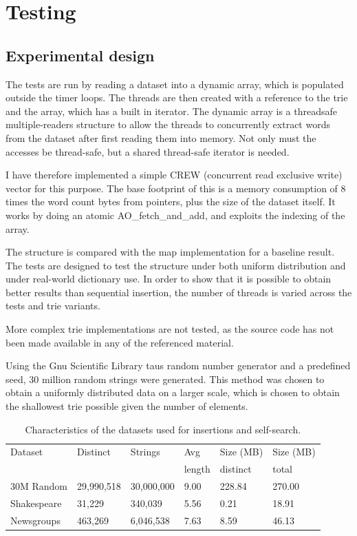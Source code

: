 \chapter{Testing}

\section{Experimental design}
The tests are run by reading a dataset into a dynamic array, which is populated
outside the timer loops. The threads are then created with a reference to the
trie and the array, which has a built in iterator. 
The dynamic array is a threadsafe multiple-readers structure to
allow the threads to concurrently extract words from the dataset after first
reading them into memory. Not only must the accesses be thread-safe, but
a shared thread-safe iterator is needed.

I have therefore implemented a simple CREW (concurrent read exclusive write)
vector for this purpose. The base footprint of this is a memory consumption
of 8 times the word count bytes from pointers, plus the size of the dataset
itself. It works by doing an atomic {\keyword AO\_fetch\_and\_add}, and
exploits the indexing of the array.

The structure is compared with the \STL map implementation for a baseline result.
The tests are designed to test the structure under both uniform distribution and
under real-world dictionary use. In order to show that it is possible to obtain
better results than sequential insertion, the number of threads is varied
across the tests and trie variants.

More complex trie implementations are not tested, as the source code has not
been made available in any of the referenced material.

Using the Gnu Scientific Library taus random number generator and a predefined
seed, 30 million random strings were generated. This method was chosen to
obtain a uniformly distributed data on a larger scale, which is chosen to
obtain the shallowest trie possible given the number of elements.

\begin{table}[h!]
    \centering
    \begin{tabular}[here]{l l l l l l}
        \hline
        Dataset    & Distinct   & Strings      & Avg     & Size (MB)& Size (MB)\\
                   &            &              & length  & distinct & total    \\\hline
        30M Random & 29,990,518 & 30,000,000   & 9.00    & 228.84   & 270.00\\
        Shakespeare&  31,229    & 340,039      & 5.56    & 0.21     & 18.91\\
        Newsgroups & 463,269    & 6,046,538    & 7.63    & 8.59     & 46.13\\
        \hline
    \end{tabular}
    \caption{Characteristics of the datasets used for insertions and self-search.}
    \label{tab:datasets}
\end{table}

